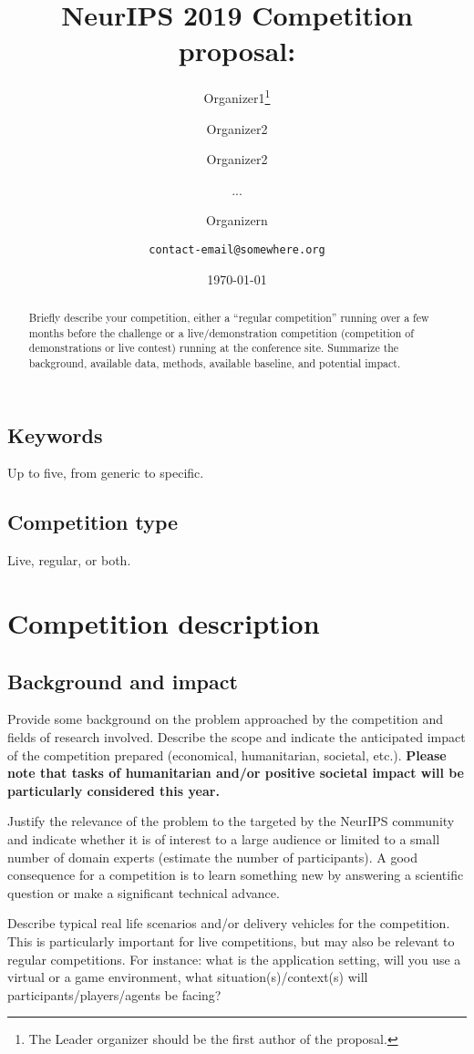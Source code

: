 \documentclass[11pt, oneside]{article}
\title{NeurIPS  2019 Competition proposal:}
\author{Organizer1\thanks{The Leader organizer should be the first author of the proposal.} \and Organizer2 \and Organizer2 \and ... \and Organizern \\ \and
{\tt contact-email@somewhere.org}\\
}
\date{\today}
\begin{document}
\maketitle

\begin{abstract}
Briefly describe your competition, either a ``regular competition'' running over a few months before the challenge or a live/demonstration competition (competition of demonstrations or live contest) running at the conference site.
Summarize the background, available data, methods, available baseline, and potential impact.
\end{abstract}

\subsection*{Keywords}
Up to five, from generic to specific.
\subsection*{Competition type} Live, regular, or both.


\section{Competition description}

\subsection{Background and impact}

Provide some background on the problem approached by the competition and fields of research involved. Describe the scope and indicate the anticipated impact of the competition prepared (economical, humanitarian, societal, etc.). \textbf{Please note that tasks of humanitarian and/or positive societal impact will be particularly considered this year.}


Justify the relevance of the problem to the targeted by the NeurIPS community and indicate whether it is of interest to a large audience or limited to a small number of domain experts (estimate the number of participants). A good consequence for a competition is to learn something new by answering a scientific question or make a significant technical advance.

Describe typical real life scenarios and/or delivery vehicles for the competition. This is particularly important for live competitions, but may also be relevant to regular competitions. For instance: what is the application setting, will you use a virtual or a game environment, what situation(s)/context(s) will participants/players/agents be facing?
\end{document}
